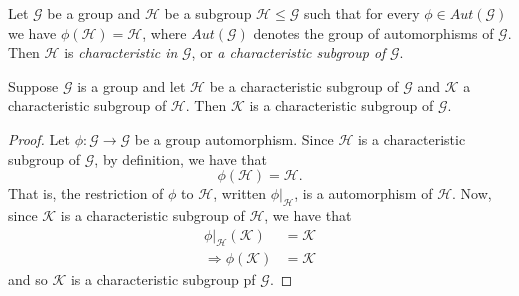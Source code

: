 \begin{defn}
	Let $\mathcal{G}$ be a group and $\mathcal{H}$ be a subgroup $\mathcal{H} \leq \mathcal{G}$
	such that for every $\phi \in Aut(\mathcal{G})$ we have $\phi (\mathcal{H})=\mathcal{H}$,
	where $Aut(\mathcal{G})$ denotes the group of automorphisms of $\mathcal{G}$. Then $\mathcal{H}$
	is \emph{characteristic in} $\mathcal{G}$, or \emph{a characteristic subgroup of} $\mathcal{G}$.
\end{defn}

\begin{thm}
	Suppose $\mathcal{G}$ is a group and let $\mathcal{H}$ be a characteristic subgroup of $\mathcal{G}$
	and $\mathcal{K}$ a characteristic subgroup of $\mathcal{H}$. Then $\mathcal{K}$ is a characteristic
	subgroup of $\mathcal{G}$.
\end{thm}

\begin{proof}
	Let $\phi : \mathcal{G} \to \mathcal{G}$ be a group automorphism. Since $\mathcal{H}$ is a characteristic
	subgroup of $\mathcal{G}$, by definition, we have that
	\[
		\phi(\mathcal{H})=\mathcal{H}.
	\]
	That is, the restriction of $\phi$ to $\mathcal{H}$, written $\phi |_{\mathcal{H}}$, is a automorphism
	of $\mathcal{H}$. Now, since $\mathcal{K}$ is a characteristic subgroup of $\mathcal{H}$, we have that
	\begin{align*}
		\phi |_{\mathcal{H}}(\mathcal{K}) &= \mathcal{K}
		\\
		\Rightarrow \phi(\mathcal{K}) &= \mathcal{K}
	\end{align*}
	and so $\mathcal{K}$ is a characteristic subgroup pf $\mathcal{G}$.
\end{proof}
